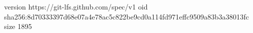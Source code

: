 version https://git-lfs.github.com/spec/v1
oid sha256:8d70333397d68e07a4e78ac5c822be9cd0a114fd971effc9509a83b3a38013fc
size 1895
